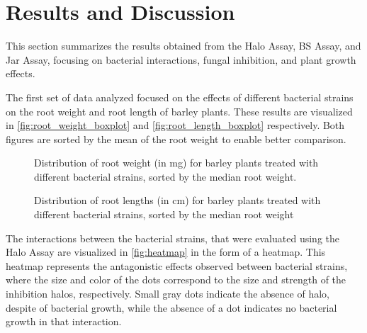 \newpage
\section{Results and Discussion}

This section summarizes the results obtained from the Halo Assay, BS Assay, and Jar Assay, focusing on bacterial interactions, fungal inhibition, and plant growth effects.

\par
The first set of data analyzed focused on the effects of different bacterial strains on the root weight and root length of barley plants. These results are visualized in \autoref{fig:root_weight_boxplot} and \autoref{fig:root_length_boxplot} respectively.
Both figures are sorted by the mean of the root weight to enable better comparison. 


\begin{figure}[H]
    \centering
    \setlength{\abovecaptionskip}{-30pt} %
    \makebox[\textwidth]{ %
    
    }
    \caption{Distribution of root weight (in mg) for barley plants treated with different bacterial strains, sorted by the median root weight.}
    \label{fig:root_weight_boxplot}
\end{figure}%

\begin{figure}[H]
    \centering
    \setlength{\abovecaptionskip}{-30pt} %
    \makebox[\textwidth]{ %
    
    }
    \caption{Distribution of root lengths (in cm) for barley plants treated with different bacterial strains, sorted by the median root weight}
    \label{fig:root_length_boxplot}
\end{figure}


The interactions between the bacterial strains, that were evaluated using the Halo Assay are visualized in \autoref{fig:heatmap} in the form of a heatmap. 
This heatmap represents the antagonistic effects observed between bacterial strains, where the size and color of the dots correspond to the size and strength of the inhibition halos, respectively. Small gray dots indicate the absence of halo, despite of bacterial growth, while the absence of a dot indicates no bacterial growth in that interaction. 

